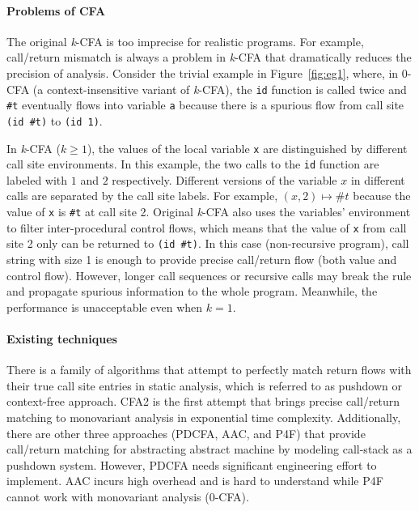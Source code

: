 \documentclass[12pt]{report}
\begin{document}
\paragraph{Problems of CFA}
The original \textit{k}-CFA is too imprecise for realistic programs.
For example, call/return mismatch is always a problem in \textit{k}-CFA that dramatically reduces the precision of analysis.
Consider the trivial example in Figure~\ref{fig:eg1}, where, in 0-CFA (a context-insensitive variant of \textit{k}-CFA), the \verb|id| function is called twice and \verb|#t| eventually flows into variable \verb|a| because there is a spurious flow from call site
\verb|(id #t)| to \verb|(id 1)|.

In \textit{k}-CFA ($k \geq 1$), the values of the local variable \verb|x| are distinguished by different call site environments.
In this example, the two calls to the \verb|id| function are labeled with $1$ and $2$ respectively.
Different versions of the variable $x$ in different calls are separated by the call site labels.
For example, $(x, 2) \mapsto \#t$ because the value of \verb|x| is \verb|#t| at call site 2.
Original \textit{k}-CFA also uses the variables' environment to filter inter-procedural control flows,
which means that the value of \verb|x| from call site 2 only can be returned to \verb|(id #t)|.
In this case (non-recursive program), call string with size 1 is enough to provide precise call/return flow
(both value and control flow). %
However, longer call sequences or recursive calls may break the rule and propagate spurious information to the whole program.
Meanwhile, the performance is unacceptable even when $k = 1$.

\paragraph{Existing techniques}
There is a family of algorithms that attempt to perfectly match return flows with their true call site entries in static analysis, which is referred to as pushdown or context-free approach.
CFA2 is the first attempt that brings precise call/return matching to monovariant analysis in exponential time complexity.
Additionally, there are other three approaches (PDCFA, AAC, and P4F) that provide call/return matching for abstracting abstract machine by modeling call-stack as a pushdown system.
However, PDCFA needs significant engineering effort to implement.
AAC incurs high overhead and is hard to understand while P4F cannot work with monovariant analysis (0-CFA).
\end{document}
